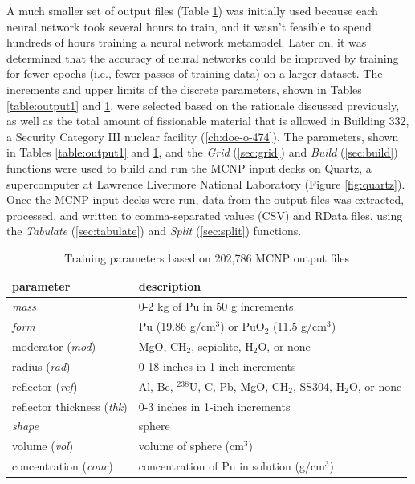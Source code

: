 A much smaller set of output files (Table \ref{table:output2}) was initially used because each neural network took several hours to train, and it wasn't feasible to spend hundreds of hours training a neural network metamodel.
Later on, it was determined that the accuracy of neural networks could be improved by training for fewer epochs (i.e., fewer passes of training data) on a larger dataset. %
The increments and upper limits of the discrete parameters, shown in Tables \ref{table:output1} and \ref{table:output2}, were selected based on the rationale discussed previously, as well as the total amount of fissionable material that is allowed in Building 332, a Security Category III nuclear facility (\ref{ch:doe-o-474}).
The parameters, shown in Tables \ref{table:output1} and \ref{table:output2}, and the \textit{Grid} (\ref{sec:grid}) and \textit{Build} (\ref{sec:build}) functions were used to build and run the MCNP input decks on Quartz, a supercomputer at Lawrence Livermore National Laboratory (Figure \ref{fig:quartz}).
Once the MCNP input decks were run, data from the output files was extracted, processed, and written to comma-separated values (CSV) and RData files, using the \textit{Tabulate} (\ref{sec:tabulate}) and \textit{Split} (\ref{sec:split}) functions.
%
\begin{table}
  \caption{Training parameters based on 202,786 MCNP output files}
  \label{table:output2}
  \renewcommand\arraystretch{1.5}
  \begin{center}
    \begin{tabular}{|l l|}
      \hline
      parameter                          & description \\
      \hline
      \textit{mass}                      & 0-2 kg of Pu in 50 g increments \\
      \textit{form}                      & Pu (19.86 g/cm$^{3}$) or PuO$_{2}$ (11.5 g/cm$^{3}$) \\
      moderator (\textit{mod})           & MgO, CH$_{2}$, sepiolite, H$_{2}$O, or none \\
      radius (\textit{rad})              & 0-18 inches in 1-inch increments \\
      reflector (\textit{ref})           & Al, Be, $^{238}$U, C, Pb, MgO, CH$_{2}$, SS304, H$_{2}$O, or none \\
      reflector thickness (\textit{thk}) & 0-3 inches in 1-inch increments \\
      \textit{shape}                     & sphere \\
      volume (\textit{vol})              & volume of sphere (cm$^{3}$) \\
      concentration (\textit{conc})      & concentration of Pu in solution (g/cm$^{3}$) \\
      \hline
    \end{tabular}
  \end{center}
\end{table}

